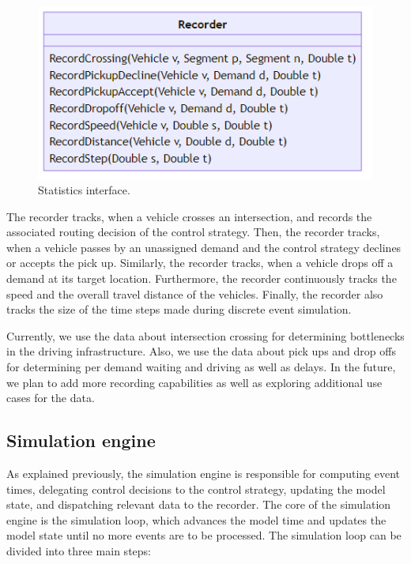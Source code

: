 \documentclass[a4paper,twoside]{article}
\begin{document}
	\begin{figure}[!ht]
		\centering
		\includegraphics[scale=0.4]{../../diagrams/statistics/classes-v2.png}
		\caption{Statistics interface.}
		\label{fig:statistics-interface}
	\end{figure}
	
	The recorder tracks, when a vehicle crosses an intersection, and records the associated routing decision of the control strategy.
	Then, the recorder tracks, when a vehicle passes by an unassigned demand and the control strategy declines or accepts the pick up.
	Similarly, the recorder tracks, when a vehicle drops off a demand at its target location.
	Furthermore, the recorder continuously tracks the speed and the overall travel distance of the vehicles.
	Finally, the recorder also tracks the size of the time steps made during discrete event simulation.
	
	Currently, we use the data about intersection crossing for determining bottlenecks in the driving infrastructure.
	Also, we use the data about pick ups and drop offs for determining per demand waiting and driving as well as delays.
	In the future, we plan to add more recording capabilities as well as exploring additional use cases for the data.
	
	\subsection{Simulation engine}
	\label{sec:simulation-engine}
	
	As explained previously, the simulation engine is responsible for computing event times, delegating control decisions to the control strategy, updating the model state, and dispatching relevant data to the recorder.
	The core of the simulation engine is the simulation loop, which advances the model time and updates the model state until no more events are to be processed.
	The simulation loop can be divided into three main steps:
	
\end{document}
